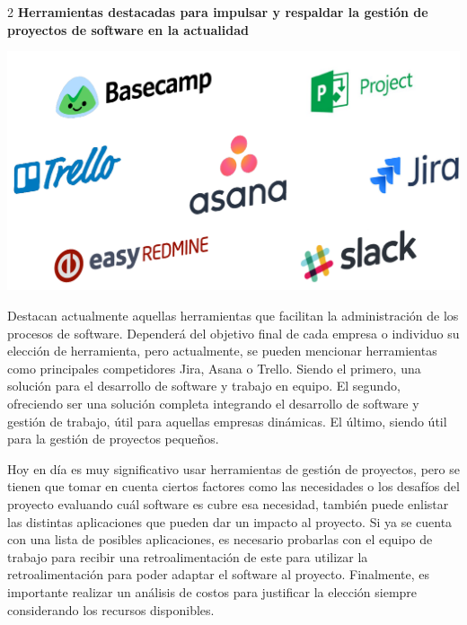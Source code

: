 \documentclass[12pt,spanish,Letterpaper,openany]{book}
\begin{document}
\begin {multicols}{2}
\textbf{Herramientas destacadas para impulsar y respaldar la gestión de proyectos de software en la actualidad}

\begin {flushleft}
\noindent\begin{minipage}[c]{\columnwidth}

\begin{center}\includegraphics[width=0.9\linewidth]{imagenes_articulos/sp11_01} \end{center}

\end{minipage}

\end {flushleft}

Destacan actualmente aquellas herramientas que facilitan la administración de los procesos de software. Dependerá del objetivo final de cada empresa o individuo su elección de herramienta, pero actualmente, se pueden mencionar herramientas como principales competidores Jira, Asana o Trello. Siendo el primero, una solución para el desarrollo de
software y trabajo en equipo. El segundo, ofreciendo ser una solución completa integrando el desarrollo de software y gestión de trabajo, útil para aquellas empresas dinámicas. El último, siendo útil para la gestión de proyectos pequeños.

Hoy en día es muy significativo usar herramientas de gestión de proyectos, pero se tienen que tomar en cuenta ciertos factores como las necesidades o los desafíos del proyecto evaluando cuál software es cubre esa necesidad, también puede enlistar las distintas aplicaciones que pueden dar un impacto al proyecto. Si ya se cuenta con una lista de posibles aplicaciones, es necesario probarlas con el equipo de trabajo para recibir una retroalimentación de este para utilizar la retroalimentación para poder adaptar el software al proyecto. Finalmente, es importante realizar un análisis de costos para justificar la elección siempre considerando los recursos disponibles.


\end{multicols}
\end{document}
